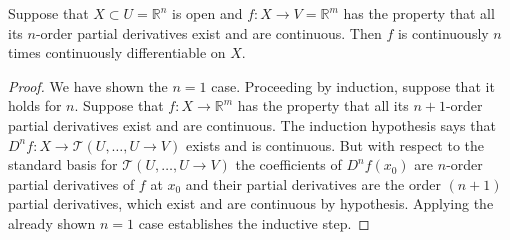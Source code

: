\documentclass[twoside, a4paper, 10pt]{amsart}
\begin{document}
\begin{thm}  Suppose that $X \subset U = \mathbb{R}^n$ is open and $f:X \to V = \mathbb{R}^m$ has the property that all its $n$-order partial derivatives exist and are continuous. Then $f$ is continuously $n$ times continuously differentiable on $X$. \end{thm} 

\begin{proof} We have shown the $n=1$ case. Proceeding by induction, suppose that it holds for $n$. Suppose that $f:X \to \mathbb{R}^m$ has the property that all its $n+1$-order partial derivatives exist and are continuous. The induction hypothesis says that $D^nf: X \to \mathcal{T}( U, \ldots, U \to V)$ exists and is continuous. But with respect to the standard basis for $\mathcal{T}( U, \ldots, U \to V)$ the coefficients of $D^nf(x_0)$ are $n$-order partial derivatives of $f$ at $x_0$ and their partial derivatives are the order $(n+1)$ partial derivatives, which exist and are continuous by hypothesis. Applying the already shown $n=1$ case establishes the inductive step.

\end{proof}


\end{document}
